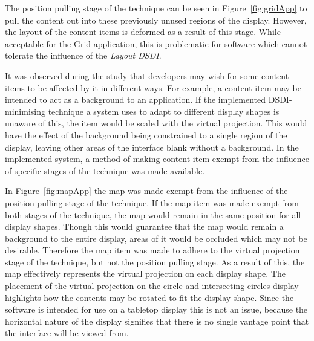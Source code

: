 \documentclass{bmcart}
\begin{document}
The position pulling stage of the technique can be seen in Figure~\ref{fig:gridApp} to pull the content out into these previously unused regions of the display.
However, the layout of the content items is deformed as a result of this stage.
While acceptable for the Grid application, this is problematic for software which cannot tolerate the influence of the {\emph{Layout \ac{DSDI}}}.

It was observed during the study that developers may wish for some content items to be affected by it in different ways.
For example, a content item may be intended to act as a background to an application.
If the implemented \ac{DSDI}-minimising technique a system uses to adapt to different display shapes is unaware of this, the item would be scaled with the virtual projection.
This would have the effect of the background being constrained to a single region of the display, leaving other areas of the interface blank without a background.
In the implemented system, a method of making content item exempt from the influence of specific stages of the technique was made available.


In Figure~\ref{fig:mapApp} the map was made exempt from the influence of the position pulling stage of the technique.
If the map item was made exempt from both stages of the technique, the map would remain in the same position for all display shapes.
Though this would guarantee that the map would remain a background to the entire display, areas of it would be occluded which may not be desirable.
Therefore the map item was made to adhere to the virtual projection stage of the technique, but not the position pulling stage.
As a result of this, the map effectively represents the virtual projection on each display shape.
The placement of the virtual projection on the circle and intersecting circles display highlights how the contents may be rotated to fit the display shape.
Since the software is intended for use on a tabletop display this is not an issue, because the horizontal nature of the display signifies that there is no single vantage point that the interface will be viewed from.

\end{document}
